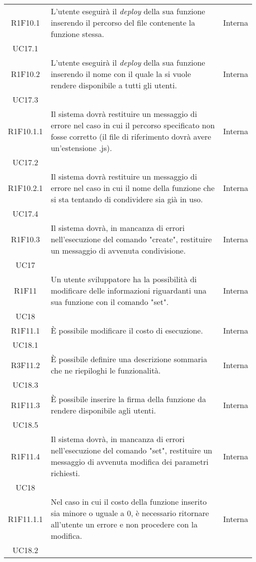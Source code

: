 \begin{longtable}{|c|p{8cm}|C{2cm}|}
	R1F10.1 &  L'utente eseguirà il \textit{deploy\glo} della sua funzione inserendo il percorso del file contenente la funzione stessa. & \centering Interna \\ UC17.1 \tabularnewline

	R1F10.2 &  L'utente eseguirà il \textit{deploy\glo} della sua funzione inserendo il nome con il quale la si vuole rendere disponibile a tutti gli utenti. & \centering Interna \\ UC17.3 \tabularnewline


	R1F10.1.1 &  Il sistema dovrà restituire un messaggio di errore nel caso in cui il percorso specificato non fosse corretto (il file di riferimento dovrà avere un'estensione .js). & \centering Interna \\ UC17.2 \tabularnewline
	
	R1F10.2.1 &  Il sistema dovrà restituire un messaggio di errore nel caso in cui il nome della funzione che si sta tentando di condividere sia già in uso. & \centering Interna \\ UC17.4 \tabularnewline

	R1F10.3 &  Il sistema dovrà, in mancanza di errori nell'esecuzione del comando "create", restituire un messaggio di avvenuta condivisione. & \centering Interna \\ UC17 \tabularnewline

	R1F11 &  Un utente sviluppatore ha la possibilità di modificare delle informazioni riguardanti una sua funzione con il comando "set". & \centering Interna \\ UC18 \tabularnewline

	R1F11.1 &  È possibile modificare il costo di esecuzione. & \centering Interna \\ UC18.1 \tabularnewline

	R3F11.2 &  È possibile definire una descrizione sommaria che ne riepiloghi le funzionalità. & \centering Interna \\ UC18.3 \tabularnewline

	R1F11.3 &  È possibile inserire la firma della funzione da rendere disponibile agli utenti. & \centering Interna \\ UC18.5 \tabularnewline

	R1F11.4 &  Il sistema dovrà, in mancanza di errori nell'esecuzione del comando "set", restituire un messaggio di avvenuta modifica dei parametri richiesti. & \centering Interna \\ UC18 \tabularnewline

	R1F11.1.1 &  Nel caso in cui il costo della funzione inserito sia minore o uguale a 0, è necessario ritornare all'utente un errore e non procedere con la modifica. & \centering Interna \\ UC18.2 \tabularnewline


\end{longtable}
